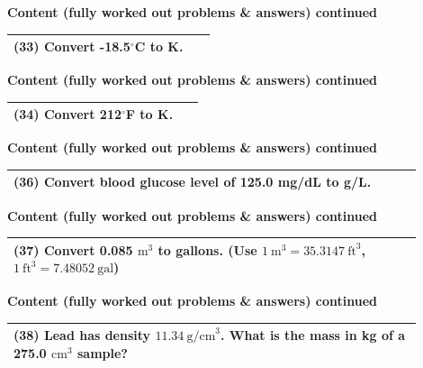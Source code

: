 \documentclass{article}
\begin{document}
\newpage
\noindent
{\large \textbf{Content (fully worked out problems \& answers) continued}} \\[0.2em]
\begin{tabular}{|p{0.9\linewidth}|}
\hline
\vspace{0.2cm}

\textbf{(33)} Convert -18.5$^\circ$C to K. \\
\hline
\end{tabular}
\newpage
\noindent
{\large \textbf{Content (fully worked out problems \& answers) continued}} \\[0.2em]
\begin{tabular}{|p{0.9\linewidth}|}
\hline
\vspace{0.2cm}

\textbf{(34)} Convert 212$^\circ$F to K. \\
\hline
\end{tabular}

\newpage
\noindent
{\large \textbf{Content (fully worked out problems \& answers) continued}} \\[0.2em]
\begin{tabular}{|p{0.9\linewidth}|}
\hline
\vspace{0.2cm}

\textbf{(36)} Convert blood glucose level of 125.0 mg/dL to g/L. \\
\hline
\end{tabular}
\newpage
{\large \textbf{Content (fully worked out problems \& answers) continued}} \\[0.2em]

\vspace{0.2cm}
\begin{tabular}{|p{0.9\linewidth}|}
\hline
\textbf{(37)} Convert 0.085 $\text{m}^3$ to gallons. (Use $1~\text{m}^3=35.3147~\text{ft}^3$, $1~\text{ft}^3=7.48052~\text{gal}$) \\
\hline
\end{tabular}
\newpage
\noindent
{\large \textbf{Content (fully worked out problems \& answers) continued}} \\[0.2em]
\begin{tabular}{|p{0.9\linewidth}|}
\hline
\vspace{0.2cm}

\textbf{(38)} Lead has density $11.34~\text{g/cm}^3$. What is the mass in kg of a 275.0 $\text{cm}^3$ sample? \\
\hline
\end{tabular}
\end{document}
